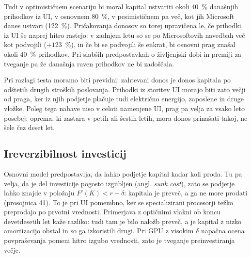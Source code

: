\documentclass[12pt,a4paper]{article}
\begin{document}
Tudi v optimističnem scenariju bi moral kapital ustvariti okoli 40~\% današnjih prihodkov iz UI, v osnovnem 80~\%, v pesimističnem pa več, kot jih Microsoft danes ustvari (122~\%). Pričakovanja donosov so torej upravičena le, če prihodki iz UI še naprej hitro rastejo: v zadnjem letu so se po Microsoftovih navedbah več kot podvojili ($+123$~\%), in če bi se podvojili še enkrat, bi osnovni prag znašal okoli 40~\% prihodkov. Pri slabših predpostavkah o življenjski dobi in premiji za tveganje pa že današnja raven prihodkov ne bi zadoščala.

Pri razlagi testa moramo biti previdni: zahtevani donos je donos kapitala po odštetih drugih stroških poslovanja. Prihodki iz storitev UI morajo biti zato večji od praga, ker iz njih podjetje plačuje tudi električno energijo, zaposlene in druge vložke. Poleg tega nabave niso v celoti namenjene UI, prag pa velja za vsako leto posebej: oprema, ki zastara v petih ali šestih letih, mora donos prinašati takoj, ne šele čez deset let.

\subsection{Ireverzibilnost investicij}

Osnovni model predpostavlja, da lahko podjetje kapital kadar koli proda. Tu pa velja, da je del investicije pogosto izgubljen (angl. \textit{sunk cost}), zato se podjetje lahko znajde v položaju $F'(K) < r + \delta$: kapitala je preveč, a ga ne more prodati (prosojnica 41). To je pri UI pomembno, ker se specializirani procesorji težko preprodajo po prvotni vrednosti. Primerjava z optičnimi vlakni ob koncu devetdesetih let kaže razliko: tudi tam je bilo naložb preveč, a je kapital z nizko amortizacijo obstal in so ga izkoristili drugi. Pri GPU z visokim $\delta$ napačna ocena povpraševanja pomeni hitro izgubo vrednosti, zato je tveganje preinvestiranja večje.



\nocite{StanfordAIIndex2026,OECD2026,FederalReserve2026,
        Microsoft10K2022,Microsoft2026Q3,FREDDFII10,BLSPPI,
        Verdict2025,iTiger2025,CUBEResearch,Grobovsek2026,Polanec2014}

\vbox{}
\end{document}
